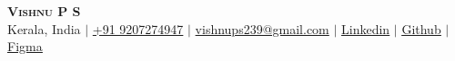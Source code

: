\begin{center}
	\textbf{\huge \scshape Vishnu P S} \\ \vspace{4pt}
	Kerala, India $|$
	\href{tel:+919207274947}{+91 9207274947} $|$
	\href{mailto:vishnups239@gmail.com}{vishnups239@gmail.com} $|$
	\href{https://www.linkedin.com/in/vishnu-ps1}{\underline{Linkedin}} $|$
	\href{https://www.github.com/vishnupeas}{\underline{Github}} $|$
	\href{https://www.figma.com/@elmiur}{\underline{Figma}} \\
\end{center}

